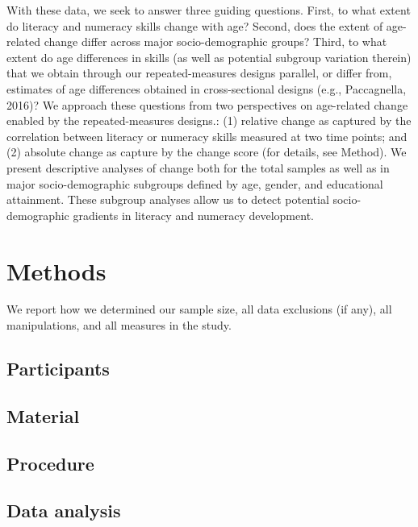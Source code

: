 \documentclass[
  english,
  man]{apa6}
\begin{document}
With these data, we seek to answer three guiding questions. First, to what extent do literacy and numeracy skills change with age? Second, does the extent of age-related change differ across major socio-demographic groups? Third, to what extent do age differences in skills (as well as potential subgroup variation therein) that we obtain through our repeated-measures designs parallel, or differ from, estimates of age differences obtained in cross-sectional designs (e.g., Paccagnella, 2016)?
We approach these questions from two perspectives on age-related change enabled by the repeated-measures designs.: (1) relative change as captured by the correlation between literacy or numeracy skills measured at two time points; and (2) absolute change as capture by the change score (for details, see Method). We present descriptive analyses of change both for the total samples as well as in major socio-demographic subgroups defined by age, gender, and educational attainment. These subgroup analyses allow us to detect potential socio-demographic gradients in literacy and numeracy development.

\hypertarget{methods}{%
\section{Methods}\label{methods}}

We report how we determined our sample size, all data exclusions (if any), all manipulations, and all measures in the study.

\hypertarget{participants}{%
\subsection{Participants}\label{participants}}

\hypertarget{material}{%
\subsection{Material}\label{material}}

\hypertarget{procedure}{%
\subsection{Procedure}\label{procedure}}

\hypertarget{data-analysis}{%
\subsection{Data analysis}\label{data-analysis}}
\end{document}
